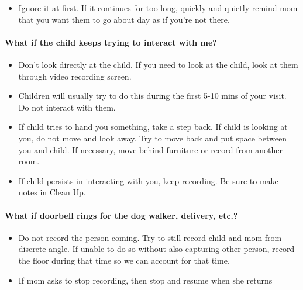 \documentclass[
  12pt,
]{book}
\providecommand{\tightlist}{%
  \setlength{\itemsep}{0pt}\setlength{\parskip}{0pt}}
\begin{document}
\begin{itemize}
\tightlist
\item
  Ignore it at first. If it continues for too long, quickly and quietly remind mom that you want them to go about day as if you're not there.
\end{itemize}

\hypertarget{what-if-the-child-keeps-trying-to-interact-with-me}{%
\paragraph*{What if the child keeps trying to interact with me?}\label{what-if-the-child-keeps-trying-to-interact-with-me}}

\begin{itemize}
\tightlist
\item
  Don't look directly at the child. If you need to look at the child, look at them through video recording screen.
\item
  Children will usually try to do this during the first 5-10 mins of your visit. Do not interact with them.
\item
  If child tries to hand you something, take a step back. If child is looking at you, do not move and look away. Try to move back and put space between you and child. If necessary, move behind furniture or record from another room.
\item
  If child persists in interacting with you, keep recording. Be sure to make notes in Clean Up.
\end{itemize}

\hypertarget{what-if-doorbell-rings-for-the-dog-walker-delivery-etc.}{%
\paragraph*{What if doorbell rings for the dog walker, delivery, etc.?}\label{what-if-doorbell-rings-for-the-dog-walker-delivery-etc.}}

\begin{itemize}
\tightlist
\item
  Do not record the person coming. Try to still record child and mom from discrete angle. If unable to do so without also capturing other person, record the floor during that time so we can account for that time.
\item
  If mom asks to stop recording, then stop and resume when she returns
\end{itemize}
\end{document}

